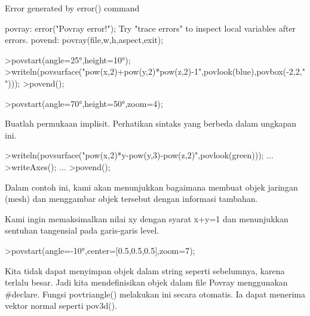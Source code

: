 \documentclass{article}
\begin{document}
\begin{eulernotebook}
\begin{euleroutput}
  Error generated by error() command
  
  povray:
      error("Povray error!");
  Try "trace errors" to inspect local variables after errors.
  povend:
      povray(file,w,h,aspect,exit); 
\end{euleroutput}
\begin{eulerprompt}
>povstart(angle=25°,height=10°); 
>writeln(povsurface("pow(x,2)+pow(y,2)*pow(z,2)-1",povlook(blue),povbox(-2,2,"")));
>povend();
\end{eulerprompt}
\begin{eulerprompt}
>povstart(angle=70°,height=50°,zoom=4);
\end{eulerprompt}
\begin{eulercomment}
Buatlah permukaan implisit. Perhatikan sintaks yang berbeda dalam
ungkapan ini.
\end{eulercomment}
\begin{eulerprompt}
>writeln(povsurface("pow(x,2)*y-pow(y,3)-pow(z,2)",povlook(green))); ...
>writeAxes(); ...
>povend();
\end{eulerprompt}
\begin{eulercomment}
Dalam contoh ini, kami akan menunjukkan bagaimana membuat objek
jaringan (mesh) dan menggambar objek tersebut dengan informasi
tambahan.

Kami ingin memaksimalkan nilai xy dengan syarat x+y=1 dan menunjukkan
sentuhan tangensial pada garis-garis level.
\end{eulercomment}
\begin{eulerprompt}
>povstart(angle=-10°,center=[0.5,0.5,0.5],zoom=7);
\end{eulerprompt}
\begin{eulercomment}
Kita tidak dapat menyimpan objek dalam string seperti sebelumnya,
karena terlalu besar. Jadi kita mendefinisikan objek dalam file Povray
menggunakan #declare. Fungsi povtriangle() melakukan ini secara
otomatis. Ia dapat menerima vektor normal seperti pov3d().


\end{eulercomment}
\end{eulernotebook}
\end{document}

